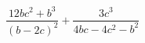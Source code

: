 \begin{ex}[type=expression]
	\begin{condition}
		\( \dfrac{12bc^2+b^3}{(b-2c)^2}+\dfrac{3c^3}{4bc-4c^2-b^2} \)
	\end{condition}
\end{ex}